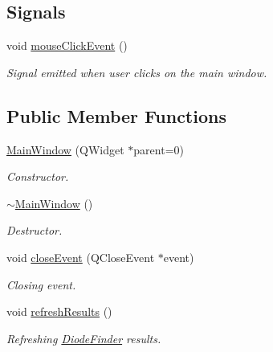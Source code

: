 \subsection*{\-Signals}
\begin{DoxyCompactItemize}
\item 
\hypertarget{classMainWindow_afea1b6eacf5b98c571e554e6778a0086}{void \hyperlink{classMainWindow_afea1b6eacf5b98c571e554e6778a0086}{mouse\-Click\-Event} ()}\label{classMainWindow_afea1b6eacf5b98c571e554e6778a0086}

\begin{DoxyCompactList}\small\item\em \-Signal emitted when user clicks on the main window. \end{DoxyCompactList}\end{DoxyCompactItemize}
\subsection*{\-Public \-Member \-Functions}
\begin{DoxyCompactItemize}
\item 
\hypertarget{classMainWindow_a8b244be8b7b7db1b08de2a2acb9409db}{\hyperlink{classMainWindow_a8b244be8b7b7db1b08de2a2acb9409db}{\-Main\-Window} (\-Q\-Widget $\ast$parent=0)}\label{classMainWindow_a8b244be8b7b7db1b08de2a2acb9409db}

\begin{DoxyCompactList}\small\item\em \-Constructor. \end{DoxyCompactList}\item 
\hypertarget{classMainWindow_ae98d00a93bc118200eeef9f9bba1dba7}{\hyperlink{classMainWindow_ae98d00a93bc118200eeef9f9bba1dba7}{$\sim$\-Main\-Window} ()}\label{classMainWindow_ae98d00a93bc118200eeef9f9bba1dba7}

\begin{DoxyCompactList}\small\item\em \-Destructor. \end{DoxyCompactList}\item 
void \hyperlink{classMainWindow_a4e20a4a065fbb0e4d3532a45a0a91425}{close\-Event} (\-Q\-Close\-Event $\ast$event)
\begin{DoxyCompactList}\small\item\em \-Closing event. \end{DoxyCompactList}\item 
\hypertarget{classMainWindow_a872f79451ca3068f25ceafc59e07df09}{void \hyperlink{classMainWindow_a872f79451ca3068f25ceafc59e07df09}{refresh\-Results} ()}\label{classMainWindow_a872f79451ca3068f25ceafc59e07df09}

\begin{DoxyCompactList}\small\item\em \-Refreshing \hyperlink{classDiodeFinder}{\-Diode\-Finder} results. \end{DoxyCompactList}\end{DoxyCompactItemize}
